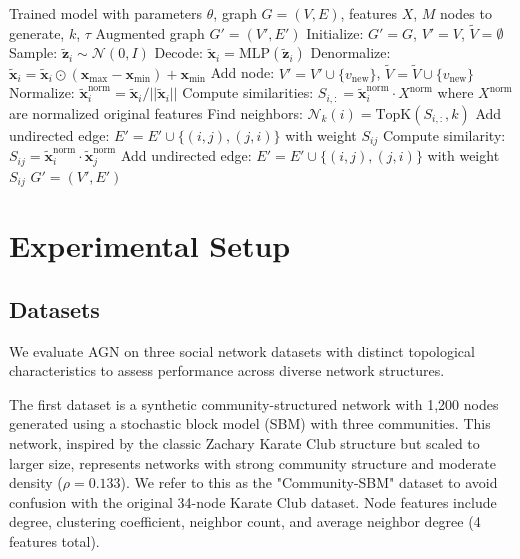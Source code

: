 \documentclass[12pt]{article}
\begin{document}
\begin{algorithm}
\caption{AGN Node Generation and Insertion}
\begin{algorithmic}[1]
\REQUIRE Trained model with parameters $\theta$, graph $G = (V, E)$, features $X$, $M$ nodes to generate, $k$, $\tau$
\ENSURE Augmented graph $G' = (V', E')$
\STATE Initialize: $G' = G$, $V' = V$, $\tilde{V} = \emptyset$
    \STATE Sample: $\tilde{\mathbf{z}}_i \sim \mathcal{N}(0, I)$
    \STATE Decode: $\tilde{\mathbf{x}}_i = \text{MLP}(\tilde{\mathbf{z}}_i)$
    \STATE Denormalize: $\tilde{\mathbf{x}}_i = \tilde{\mathbf{x}}_i \odot (\mathbf{x}_{\max} - \mathbf{x}_{\min}) + \mathbf{x}_{\min}$
    \STATE Add node: $V' = V' \cup \{v_{\text{new}}\}$, $\tilde{V} = \tilde{V} \cup \{v_{\text{new}}\}$
\ENDFOR
{}
    \STATE Normalize: $\tilde{\mathbf{x}}_i^{\text{norm}} = \tilde{\mathbf{x}}_i / ||\tilde{\mathbf{x}}_i||$
    \STATE Compute similarities: $S_{i,:} = \tilde{\mathbf{x}}_i^{\text{norm}} \cdot X^{\text{norm}}$ where $X^{\text{norm}}$ are normalized original features
    \STATE Find neighbors: $\mathcal{N}_k(i) = \text{TopK}(S_{i,:}, k)$
            \STATE Add undirected edge: $E' = E' \cup \{(i, j), (j, i)\}$ with weight $S_{ij}$
        \ENDIF
    \ENDFOR
\ENDFOR
{}
    \STATE Compute similarity: $S_{ij} = \tilde{\mathbf{x}}_i^{\text{norm}} \cdot \tilde{\mathbf{x}}_j^{\text{norm}}$
        \STATE Add undirected edge: $E' = E' \cup \{(i, j), (j, i)\}$ with weight $S_{ij}$
    \ENDIF
\ENDFOR
\RETURN $G' = (V', E')$
\end{algorithmic}
\end{algorithm}

\section{Experimental Setup}

\subsection{Datasets}

We evaluate AGN on three social network datasets with distinct topological characteristics to assess performance across diverse network structures.

The first dataset is a synthetic community-structured network with 1,200 nodes generated using a stochastic block model (SBM) with three communities. This network, inspired by the classic Zachary Karate Club structure but scaled to larger size, represents networks with strong community structure and moderate density ($\rho = 0.133$). We refer to this as the "Community-SBM" dataset to avoid confusion with the original 34-node Karate Club dataset. Node features include degree, clustering coefficient, neighbor count, and average neighbor degree (4 features total).
\end{document}
